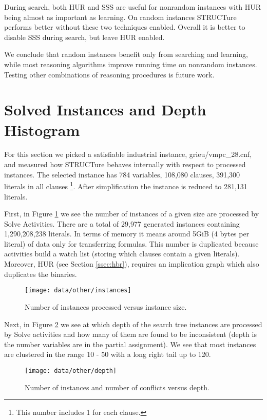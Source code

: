 During search, both HUR and SSS are useful for nonrandom instances
with HUR being almost as important as learning. On random
instances STRUCTure performs better without these two techniques
enabled. Overall it is better to disable SSS during search, but
leave HUR enabled.

We conclude that random instances benefit only from searching and
learning, while most reasoning algorithms improve running time
on nonrandom instances.  Testing other combinations of reasoning
procedures is future work.



\section{Solved Instances and Depth Histogram}
\label{sec:histograms}

For this section we picked a satisfiable industrial instance,
\textsf{grieu/vmpc\_28.cnf}, and measured how STRUCTure behaves
internally with respect to processed instances. The selected
instance has 784 variables, 108,080 clauses, 391,300 literals in all
clauses \footnote{This number includes 1 for each clause.}. After
simplification the instance is reduced to 281,131 literals.

First, in Figure \ref{fig:num-instances} we see the number of
instances of a given size are processed by Solve Activities. There
are a total of 29,977 generated instances containing 1,290,208,238
literals. In terms of memory it means around 5GiB (4 bytes per
literal) of data only for transferring formulas. This number is
duplicated because activities build a watch list (storing which
clauses contain a given literals). Moreover, HUR (see Section
\ref{ssec:hbr}), requires an implication graph which also
duplicates the binaries.

\begin{figure}
  \centering
  \texttt{[image: data/other/instances]}
  \caption{Number of instances processed versus instance size.}
  \label{fig:num-instances}
\end{figure}

Next, in Figure \ref{fig:num-depth} we see at which depth of the
search tree instances are processed by Solve activities and how many
of them are found to be inconsistent (depth is the number variables
are in the partial assignment). We see that most instances are
clustered in the range 10 - 50 with a long right tail up to 120.


\begin{figure}
  \centering
  \texttt{[image: data/other/depth]}
  \caption{Number of instances and number of conflicts versus depth.}
  \label{fig:num-depth}
\end{figure}


